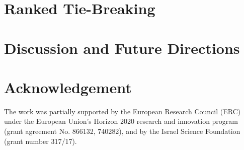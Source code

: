 \documentclass[runningheads]{llncs}
\begin{document}
\section{Ranked Tie-Breaking}
\label{sec:prophet_lex}

\section{Discussion and Future Directions}
\label{sec:future}

\section*{Acknowledgement}
The work was partially supported by the European Research Council (ERC) under the European Union's Horizon 2020 research and innovation program (grant agreement No. 866132, 740282), and by the Israel Science Foundation (grant number 317/17).
%
%
%
 
 
%
\end{document}
